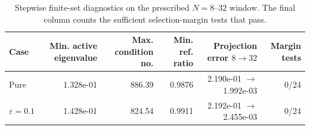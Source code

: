 \begin{table}[!htbp]
\centering\scriptsize
\caption{Stepwise finite-set diagnostics on the prescribed $N=8$--$32$ window. The final column counts the sufficient selection-margin tests that pass.}
\label{tab:window-diagnostics}
\begin{tabular}{@{}lrrrrr@{}}
\toprule
Case & Min. active eigenvalue & Max. condition no. & Min. ref. ratio & Projection error $8\to32$ & Margin tests \\ \midrule
Pure & 1.328e-01 & 886.39 & 0.9876 & 2.190e-01 $\to$ 1.992e-03 & 0/24 \\
$\varepsilon=0.1$ & 1.428e-01 & 824.54 & 0.9911 & 2.192e-01 $\to$ 2.455e-03 & 0/24 \\
\bottomrule
\end{tabular}
\end{table}
